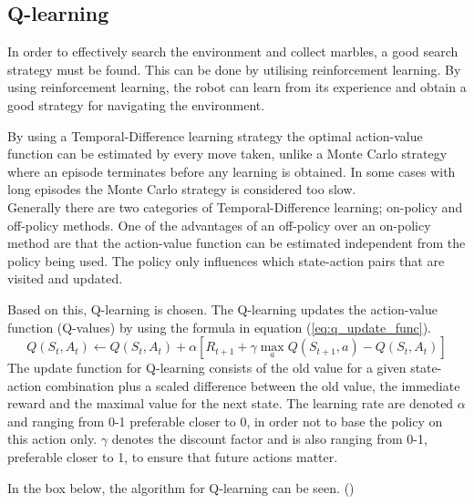 \documentclass[../Head/Main.tex]{subfiles}
\begin{document}
\subsection{Q-learning}
In order to effectively search the environment and collect marbles, a good search strategy must be found. This can be done by utilising reinforcement learning. By using reinforcement learning, the robot can learn from its experience and obtain a good strategy for navigating the environment.\par
By using a Temporal-Difference learning strategy the optimal action-value function can be estimated by every move taken, unlike a Monte Carlo strategy where an episode terminates before any learning is obtained. In some cases with long episodes the Monte Carlo strategy is considered too slow.\\
Generally there are two categories of Temporal-Difference learning; on-policy and off-policy methods. One of the advantages of an off-policy over an on-policy method are that the action-value function can be estimated independent from the policy being used. The policy only influences which state-action pairs that are visited and updated.\par 
Based on this, Q-learning is chosen. The Q-learning updates the action-value function (Q-values) by using the formula in equation (\ref{eq:q_update_func}).
\begin{equation}\label{eq:q_update_func}
Q\left(S_t,A_t\right) \leftarrow Q\left(S_t,A_t\right) + \alpha\left[R_{t+1}+\gamma\max_a Q\left(S_{t+1},a\right)-Q\left(S_t,A_t\right)\right]
\end{equation}
The update function for Q-learning consists of the old value for a given state-action combination plus a scaled difference between the old value, the immediate reward and the maximal value for the next state. The learning rate are denoted $\alpha$ and ranging from 0-1 preferable closer to 0, in order not to base the policy on this action only. $\gamma$ denotes the discount factor and is also ranging from 0-1, preferable closer to 1, to ensure that future actions matter.\par
In the box below, the algorithm for Q-learning can be seen. (\cite[p. 131-136]{RL})

\end{document}
